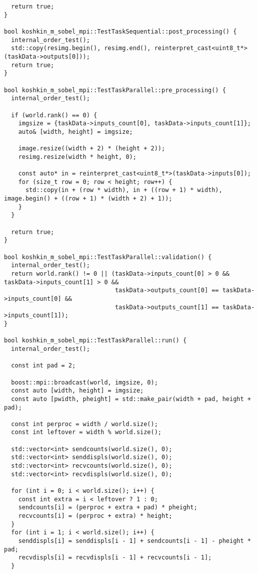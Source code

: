 \documentclass[12pt]{article}
\begin{document}
\begin{lstlisting}
  return true;
}

bool koshkin_m_sobel_mpi::TestTaskSequential::post_processing() {
  internal_order_test();
  std::copy(resimg.begin(), resimg.end(), reinterpret_cast<uint8_t*>(taskData->outputs[0]));
  return true;
}

bool koshkin_m_sobel_mpi::TestTaskParallel::pre_processing() {
  internal_order_test();

  if (world.rank() == 0) {
    imgsize = {taskData->inputs_count[0], taskData->inputs_count[1]};
    auto& [width, height] = imgsize;

    image.resize((width + 2) * (height + 2));
    resimg.resize(width * height, 0);

    const auto* in = reinterpret_cast<uint8_t*>(taskData->inputs[0]);
    for (size_t row = 0; row < height; row++) {
      std::copy(in + (row * width), in + ((row + 1) * width), image.begin() + ((row + 1) * (width + 2) + 1));
    }
  }

  return true;
}

bool koshkin_m_sobel_mpi::TestTaskParallel::validation() {
  internal_order_test();
  return world.rank() != 0 || (taskData->inputs_count[0] > 0 && taskData->inputs_count[1] > 0 &&
                               taskData->outputs_count[0] == taskData->inputs_count[0] &&
                               taskData->outputs_count[1] == taskData->inputs_count[1]);
}

bool koshkin_m_sobel_mpi::TestTaskParallel::run() {
  internal_order_test();

  const int pad = 2;

  boost::mpi::broadcast(world, imgsize, 0);
  const auto [width, height] = imgsize;
  const auto [pwidth, pheight] = std::make_pair(width + pad, height + pad);

  const int perproc = width / world.size();
  const int leftover = width % world.size();

  std::vector<int> sendcounts(world.size(), 0);
  std::vector<int> senddispls(world.size(), 0);
  std::vector<int> recvcounts(world.size(), 0);
  std::vector<int> recvdispls(world.size(), 0);

  for (int i = 0; i < world.size(); i++) {
    const int extra = i < leftover ? 1 : 0;
    sendcounts[i] = (perproc + extra + pad) * pheight;
    recvcounts[i] = (perproc + extra) * height;
  }
  for (int i = 1; i < world.size(); i++) {
    senddispls[i] = senddispls[i - 1] + sendcounts[i - 1] - pheight * pad;
    recvdispls[i] = recvdispls[i - 1] + recvcounts[i - 1];
  }


\end{lstlisting}
\end{document}
